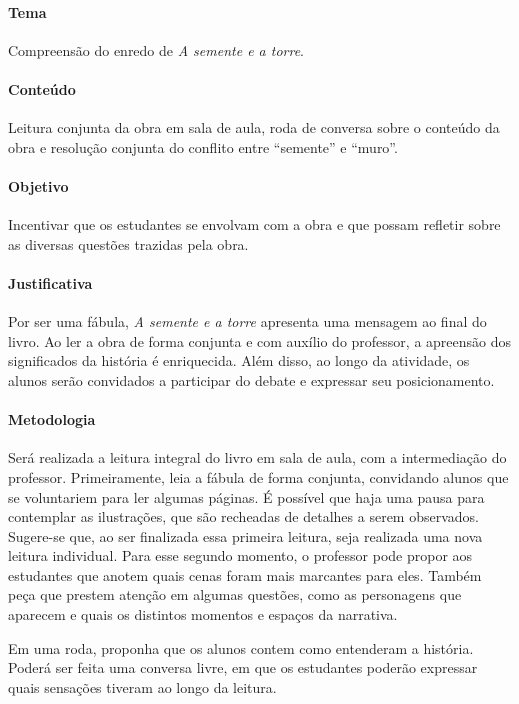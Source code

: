 \documentclass[11pt]{extarticle}
\begin{document}
\paragraph{Tema} Compreensão do enredo de \textit{A semente e a torre}.

\paragraph{Conteúdo} Leitura conjunta da obra em sala de aula, roda de conversa sobre o conteúdo da obra e resolução conjunta do conflito entre ``semente'' e ``muro''.

\paragraph{Objetivo} Incentivar que os estudantes se envolvam com a obra e que possam refletir sobre as diversas questões trazidas pela obra.

\paragraph{Justificativa} Por ser uma fábula, \textit{A semente e a torre} apresenta uma mensagem ao final do livro. Ao ler a obra de forma conjunta e com auxílio do professor, a apreensão dos significados da história é enriquecida. Além disso, ao longo da atividade, os alunos serão convidados a participar do debate e expressar seu posicionamento.

\paragraph{Metodologia} Será realizada a leitura integral do livro em sala de aula, com a intermediação do professor. Primeiramente, leia a fábula de forma conjunta, convidando alunos que se voluntariem para ler algumas páginas. É possível que haja uma pausa para contemplar as ilustrações, que são recheadas de detalhes a serem observados. Sugere-se que, ao ser finalizada essa primeira leitura, seja realizada uma nova leitura individual. Para esse segundo momento, o professor pode propor aos estudantes que anotem quais cenas foram mais marcantes para eles. Também peça que prestem atenção em algumas questões, como as personagens que aparecem e quais os distintos momentos e espaços da narrativa.

Em uma roda, proponha que os alunos contem como entenderam a história. Poderá ser feita uma conversa livre, em que os estudantes poderão expressar quais sensações tiveram ao longo da leitura. 
\end{document}
